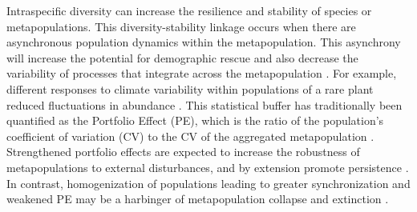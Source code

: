 \documentclass{revtex4}
\begin{document}
Intraspecific diversity can increase the resilience and stability of species or metapopulations. 
This diversity-stability linkage occurs when there are asynchronous population dynamics within the metapopulation. 
This asynchrony will increase the potential for demographic rescue \citep{Brown:1977gk,Earn:2000fm} and also decrease the variability of processes that integrate across the metapopulation \citep{Anonymous:2015gf}. 
For example, different responses to climate variability within populations of a rare plant reduced fluctuations in abundance \citep{Abbott:2017hl}. 
This statistical buffer has traditionally been quantified as the Portfolio Effect (PE), which is the ratio of the population's coefficient of variation (CV) to the CV of the aggregated metapopulation \citep{Thibaut:2012km}. 
Strengthened portfolio effects are expected to increase the robustness of metapopulations to external disturbances, and by extension promote persistence \citep{Thibaut:2012km}.
In contrast, homogenization of populations leading to greater synchronization and weakened PE may be a harbinger of metapopulation collapse and extinction \citep{Carlson:2011ce}.
\end{document}
